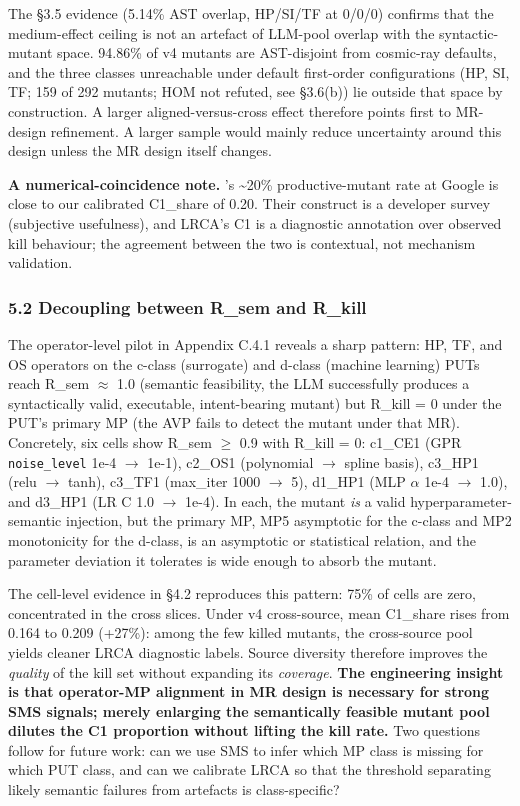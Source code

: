 \documentclass[review,12pt,authoryear]{elsarticle}
\begin{document}
The §3.5 evidence (5.14\% AST overlap, HP/SI/TF at 0/0/0) confirms that
the medium-effect ceiling is not an artefact of LLM-pool overlap with
the syntactic-mutant space. 94.86\% of v4 mutants are AST-disjoint from
cosmic-ray defaults, and the three classes unreachable under default
first-order configurations (HP, SI, TF; 159 of 292 mutants; HOM not
refuted, see §3.6(b)) lie outside that space by construction. A
larger aligned-versus-cross effect therefore points first to MR-design
refinement. A larger sample would mainly reduce uncertainty around this
design unless the MR design itself changes.

\textbf{A numerical-coincidence note.} \citeauthor{1929c365d171c78c9c24b242b5b57e2832bc907b}'s \citeyearpar{1929c365d171c78c9c24b242b5b57e2832bc907b}
\textasciitilde20\% productive-mutant rate at Google is close to our
calibrated C1\_share of 0.20. Their construct is a developer survey
(subjective usefulness), and LRCA's C1 is a diagnostic annotation over
observed kill behaviour; the agreement between the two is contextual,
not mechanism validation.

\subsubsection{5.2 Decoupling between R\_sem and R\_kill}\label{decoupling-between-r_sem-and-r_kill}

The operator-level pilot in Appendix C.4.1 reveals a sharp pattern: HP,
TF, and OS operators on the c-class (surrogate) and d-class (machine
learning) PUTs reach R\_sem $\approx$ 1.0 (semantic feasibility, the LLM
successfully produces a syntactically valid, executable, intent-bearing
mutant) but R\_kill = 0 under the PUT's primary MP (the AVP fails to
detect the mutant under that MR). Concretely, six cells show R\_sem $\geq$
0.9 with R\_kill = 0: c1\_CE1 (GPR \texttt{noise\_level} 1e-4 $\to$ 1e-1),
c2\_OS1 (polynomial $\to$ spline basis), c3\_HP1 (relu $\to$ tanh), c3\_TF1
(max\_iter 1000 $\to$ 5), d1\_HP1 (MLP $\alpha$ 1e-4 $\to$ 1.0), and d3\_HP1 (LR C 1.0
$\to$ 1e-4). In each, the mutant \emph{is} a valid hyperparameter-semantic
injection, but the primary MP, MP5 asymptotic for the c-class and MP2
monotonicity for the d-class, is an asymptotic or statistical relation,
and the parameter deviation it tolerates is wide enough to absorb the
mutant.

The cell-level evidence in §4.2 reproduces this pattern: 75\% of cells
are zero, concentrated in the cross slices. Under v4 cross-source, mean
C1\_share rises from 0.164 to 0.209 (+27\%): among the few killed
mutants, the cross-source pool yields cleaner LRCA diagnostic labels.
Source diversity therefore improves the \emph{quality} of the kill set
without expanding its \emph{coverage}. \textbf{The engineering insight is that
operator-MP alignment in MR design is necessary for strong SMS signals;
merely enlarging the semantically feasible mutant pool dilutes the C1
proportion without lifting the kill rate.} Two questions follow for future work:
can we use SMS to infer which MP class is missing for which PUT class,
and can we calibrate LRCA so that the threshold separating likely
semantic failures from artefacts is class-specific?
\end{document}
